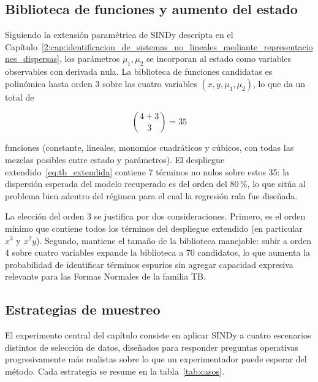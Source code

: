 \subsection{Biblioteca de funciones y aumento del estado}

Siguiendo la extensión paramétrica de SINDy descripta en el Capítulo~\ref{2:cap:identificacion_de_sistemas_no_lineales_mediante_representaciones_dispersas}, los parámetros $\mu_1, \mu_2$ se incorporan al estado como variables observables con derivada nula. La biblioteca de funciones candidatas es polinómica hasta orden 3 sobre las cuatro variables $(x, y, \mu_1, \mu_2)$, lo que da un total de

\[
\binom{4 + 3}{3} = 35
\]

funciones (constante, lineales, monomios cuadráticos y cúbicos, con todas las mezclas posibles entre estado y parámetros). El despliegue extendido~\eqref{eq:tb_extendida} contiene 7 términos no nulos sobre estos 35: la dispersión esperada del modelo recuperado es del orden del 80\,\%, lo que sitúa al problema bien adentro del régimen para el cual la regresión rala fue diseñada.

La elección del orden 3 se justifica por dos consideraciones. Primero, es el orden mínimo que contiene todos los términos del despliegue extendido (en particular $x^3$ y $x^2 y$). Segundo, mantiene el tamaño de la biblioteca manejable: subir a orden 4 sobre cuatro variables expande la biblioteca a 70 candidatos, lo que aumenta la probabilidad de identificar términos espurios sin agregar capacidad expresiva relevante para las Formas Normales de la familia TB.

\subsection{Estrategias de muestreo}
\label{3:subsec:casos_muestreo}

El experimento central del capítulo consiste en aplicar SINDy a cuatro escenarios distintos de selección de datos, diseñados para responder preguntas operativas progresivamente más realistas sobre lo que un experimentador puede esperar del método. Cada estrategia se resume en la tabla~\ref{tab:casos}.


